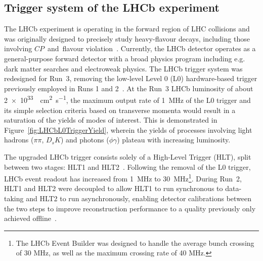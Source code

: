 \subsection{Trigger system of the LHCb experiment}

The LHCb experiment is operating in the forward region of LHC collisions and was originally designed to precisely study heavy-flavour decays, including those involving $CP$~and~flavour violation~\cite{LHCb:detector-paper}.
Currently, the LHCb detector operates as a general-purpose forward detector with a broad physics program including e.g. dark matter searches and electroweak physics. 
The LHCb trigger system was redesigned for Run~3, removing the low-level Level 0 (L0) hardware-based trigger previously employed in Runs 1 and 2~\cite{LHCb:upgrade_trigger_TDR}.
At the Run~3 LHCb luminosity of about \SI{2e33}{\per\square\cm\per\second}, the maximum output rate of \SI{1}{\mega\hertz} of the L0 trigger and its simple selection criteria based on transverse momenta would result in a saturation of the yields of modes of interest. 
This is demonstrated in Figure~\ref{fig:LHCbL0TriggerYield}, wherein the yields of processes involving light hadrons ($\pi\pi$, $D_s K$) and photons ($\phi\gamma$) plateau with increasing luminosity.

The upgraded LHCb trigger consists solely of a High-Level Trigger (HLT), split between two stages: HLT1 and HLT2~\cite{Aaij:2019uij}. Following the removal of the L0 trigger, LHCb event readout has increased from \SI{1}{\mega\hertz} to \SI{30}{\mega\hertz}\footnote{The LHCb Event Builder was designed to handle the average bunch crossing of 30 MHz, as well as the maximum crossing rate of 40 MHz.}. During Run~2, HLT1 and HLT2 were decoupled to allow HLT1 to run synchronous to data-taking and HLT2 to run asynchronously, enabling detector calibrations between the two steps to improve reconstruction performance to a quality previously only achieved offline~\cite{LHCb:upgrade_trigger_TDR}.

